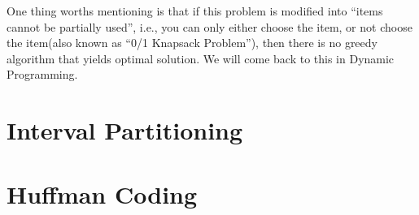 \begin{spacing}{1.3}
    One thing worths mentioning is that if this problem is modified into ``items 
    cannot be partially used'', i.e., you can only either choose the item, or 
    not choose the item(also known as ``0/1 Knapsack Problem''), then there is no 
    greedy algorithm that yields optimal solution. We will come back to this in 
    Dynamic Programming.


    \section{Interval Partitioning}


    \section{Huffman Coding}


\end{spacing}